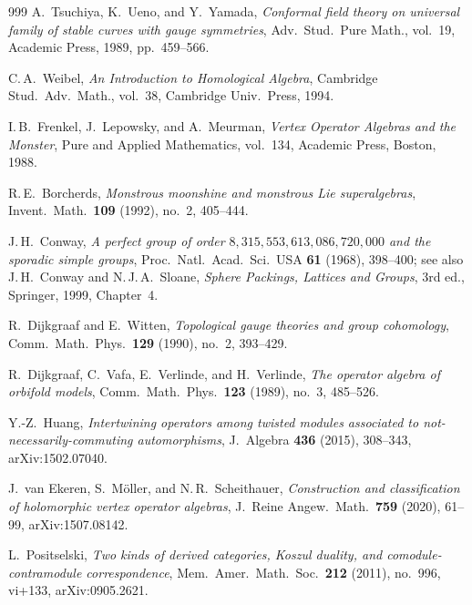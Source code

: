 \documentclass[11pt]{memoir}
\begin{document}
\begin{thebibliography}{999}
A.~Tsuchiya, K.~Ueno, and Y.~Yamada, \emph{Conformal field theory on universal family of stable curves with gauge symmetries}, Adv.\ Stud.\ Pure Math., vol.~19, Academic Press, 1989, pp.~459--566.

C.\,A.~Weibel, \emph{An Introduction to Homological Algebra}, Cambridge Stud.\ Adv.\ Math., vol.~38, Cambridge Univ.\ Press, 1994.

I.\,B.~Frenkel, J.~Lepowsky, and A.~Meurman, \emph{Vertex Operator Algebras and the Monster}, Pure and Applied Mathematics, vol.~134, Academic Press, Boston, 1988.

R.\,E.~Borcherds, \emph{Monstrous moonshine and monstrous Lie superalgebras}, Invent.\ Math.\ \textbf{109} (1992), no.~2, 405--444.

J.\,H.~Conway, \emph{A perfect group of order $8{,}315{,}553{,}613{,}086{,}720{,}000$ and the sporadic simple groups}, Proc.\ Natl.\ Acad.\ Sci.\ USA \textbf{61} (1968), 398--400; see also J.\,H.~Conway and N.\,J.\,A.~Sloane, \emph{Sphere Packings, Lattices and Groups}, 3rd ed., Springer, 1999, Chapter~4.

R.~Dijkgraaf and E.~Witten, \emph{Topological gauge theories and group cohomology}, Comm.\ Math.\ Phys.\ \textbf{129} (1990), no.~2, 393--429.

R.~Dijkgraaf, C.~Vafa, E.~Verlinde, and H.~Verlinde, \emph{The operator algebra of orbifold models}, Comm.\ Math.\ Phys.\ \textbf{123} (1989), no.~3, 485--526.

Y.-Z.~Huang, \emph{Intertwining operators among twisted modules associated to not-necessarily-commuting automorphisms}, J.~Algebra \textbf{436} (2015), 308--343, arXiv:1502.07040.

J.~van Ekeren, S.~M\"oller, and N.\,R.~Scheithauer, \emph{Construction and classification of holomorphic vertex operator algebras}, J.~Reine Angew.\ Math.\ \textbf{759} (2020), 61--99, arXiv:1507.08142.


L.~Positselski, \emph{Two kinds of derived categories, Koszul duality, and comodule-contramodule correspondence}, Mem.\ Amer.\ Math.\ Soc.\ \textbf{212} (2011), no.~996, vi+133, arXiv:0905.2621.


\end{thebibliography}
\end{document}
